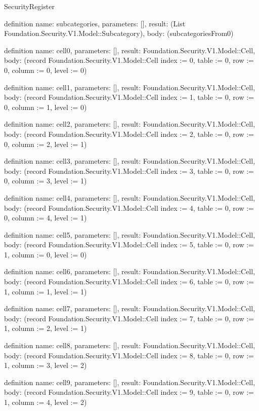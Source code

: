 \begin{lexlean}{SecurityRegister}
\begin{semanticmodule}
definition{
  name: subcategories,
  parameters: [],
  result: (List Foundation.Security.V1.Model::Subcategory),
  body: (subcategoriesFrom0)
}

definition{
  name: cell0,
  parameters: [],
  result: Foundation.Security.V1.Model::Cell,
  body: (record Foundation.Security.V1.Model::Cell {index := 0, table := 0, row := 0, column := 0, level := 0})
}

definition{
  name: cell1,
  parameters: [],
  result: Foundation.Security.V1.Model::Cell,
  body: (record Foundation.Security.V1.Model::Cell {index := 1, table := 0, row := 0, column := 1, level := 0})
}

definition{
  name: cell2,
  parameters: [],
  result: Foundation.Security.V1.Model::Cell,
  body: (record Foundation.Security.V1.Model::Cell {index := 2, table := 0, row := 0, column := 2, level := 1})
}

definition{
  name: cell3,
  parameters: [],
  result: Foundation.Security.V1.Model::Cell,
  body: (record Foundation.Security.V1.Model::Cell {index := 3, table := 0, row := 0, column := 3, level := 1})
}

definition{
  name: cell4,
  parameters: [],
  result: Foundation.Security.V1.Model::Cell,
  body: (record Foundation.Security.V1.Model::Cell {index := 4, table := 0, row := 0, column := 4, level := 1})
}

definition{
  name: cell5,
  parameters: [],
  result: Foundation.Security.V1.Model::Cell,
  body: (record Foundation.Security.V1.Model::Cell {index := 5, table := 0, row := 1, column := 0, level := 0})
}

definition{
  name: cell6,
  parameters: [],
  result: Foundation.Security.V1.Model::Cell,
  body: (record Foundation.Security.V1.Model::Cell {index := 6, table := 0, row := 1, column := 1, level := 1})
}

definition{
  name: cell7,
  parameters: [],
  result: Foundation.Security.V1.Model::Cell,
  body: (record Foundation.Security.V1.Model::Cell {index := 7, table := 0, row := 1, column := 2, level := 1})
}

definition{
  name: cell8,
  parameters: [],
  result: Foundation.Security.V1.Model::Cell,
  body: (record Foundation.Security.V1.Model::Cell {index := 8, table := 0, row := 1, column := 3, level := 2})
}

definition{
  name: cell9,
  parameters: [],
  result: Foundation.Security.V1.Model::Cell,
  body: (record Foundation.Security.V1.Model::Cell {index := 9, table := 0, row := 1, column := 4, level := 2})
}


\end{semanticmodule}
\end{lexlean}
